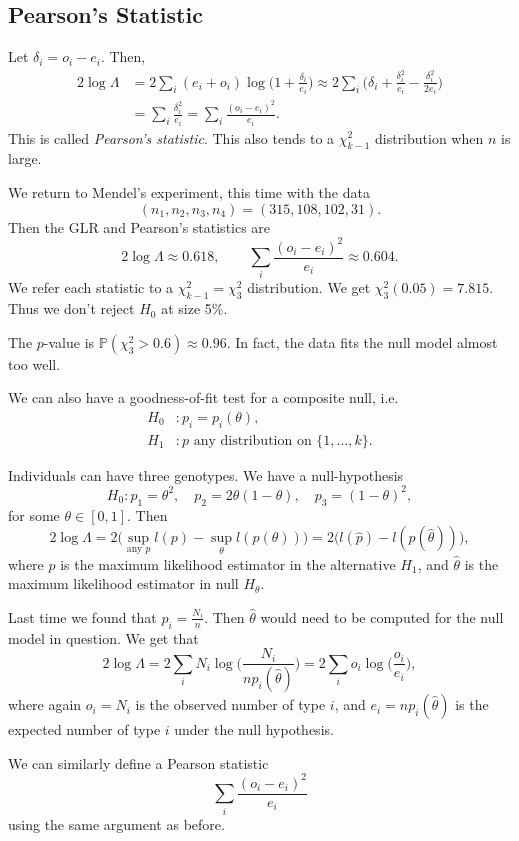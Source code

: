 \documentclass[12pt]{article}
\begin{document}
\subsection{Pearson's Statistic}
\label{sub:pearsons_statistic}

Let $\delta_i = o_i - e_i$. Then,
\begin{align*}
	2 \log \Lambda &= 2 \sum_{i}(e_i + o_i) \log \biggl( 1 + \frac{\delta_i}{e_i} \biggr) \approx 2 \sum_{i} \biggl(\delta_i + \frac{\delta_i^2}{e_i} - \frac{\delta_i^2}{2 e_i} \biggr) \\
		       &= \sum_{i} \frac{\delta_i^2}{e_i} = \sum_{i} \frac{(o_i - e_i)^2}{e_i}.
\end{align*}
This is called \emph{Pearson's statistic}. This also tends to a $\chi_{k-1}^2$ distribution when $n$ is large.

\begin{exbox}
	We return to Mendel's experiment, this time with the data
	\[
		(n_1, n_2, n_3, n_4) = (315, 108, 102, 31).
	\]
	Then the GLR and Pearson's statistics are
	\[
	2 \log \Lambda \approx 0.618, \qquad \sum_{i} \frac{(o_i - e_i)^2}{e_i} \approx 0.604.
	\]
	We refer each statistic to a $\chi_{k-1}^2 = \chi_{3}^2$ distribution. We get $\chi_{3}^2(0.05) = 7.815$. Thus we don't reject $H_0$ at size 5\%.

	The $p$-value is $\mathbb{P}(\chi_{3}^2 > 0.6) \approx 0.96$. In fact, the data fits the null model almost too well.
\end{exbox}

We can also have a goodness-of-fit test for a composite null, i.e.
\begin{align*}
	H_0 &: p_i = p_i(\theta), \\
	H_1 &: p \text{ any distribution on } \{1, \ldots, k\}.
\end{align*}

\begin{exbox}
	Individuals can have three genotypes. We have a null-hypothesis
	\[
	H_0 : p_1 = \theta^2, \quad p_2 = 2 \theta(1 - \theta), \quad p_3 = (1 - \theta)^2,
	\]
	for some $\theta \in [0,1]$. Then
	\[
		2 \log \Lambda = 2 \bigl( \sup_{\text{any } p} l(p) - \sup_{\theta} l(p(\theta)) \bigr) = 2 \bigl( l(\hat p) - l(p(\hat \theta)) \bigr),
	\]
	where $\hat p$ is the maximum likelihood estimator in the alternative $H_1$, and $\hat \theta$ is the maximum likelihood estimator in null $H_{\theta}$.

	Last time we found that $\hat p_i = \frac{N_i}{n}$. Then $\hat \theta$ would need to be computed for the null model in question. We get that
	\[
	2 \log \Lambda = 2 \sum_{i} N_i \log \biggl( \frac{N_i}{n p_i(\hat \theta)} \biggr) = 2 \sum_{i} o_i \log \biggl( \frac{o_i}{e_i} \biggr),
	\]
	where again $o_i = N_i$ is the observed number of type $i$, and $e_i = n p_i (\hat \theta)$ is the expected number of type $i$ under the null hypothesis.
\end{exbox}
We can similarly define a Pearson statistic
\[
\sum_{i} \frac{(o_i - e_i)^2}{e_i}
\]
using the same argument as before.
\end{document}
